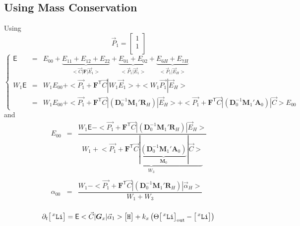 \documentclass[aps,onecolumn,11pt]{revtex4}
\newcommand{\mychem}[1]{\mathtt{#1}}
\newcommand{\myconc}[1]{\big[#1\big]}
\newcommand{\spLi}[1]{{\!~^{#1}\mychem{Li}}}
\newcommand{\Li}[1]{\myconc{\spLi{#1}}}
\newcommand{\spproton}{\mychem{H}}
\newcommand{\proton}{\myconc{\spproton}}
\newcommand{\myout}[1]{{#1}_{\mathrm{out}}}
\newcommand{\LiOut}[1]{\myout{\Li{#1}}}
\newcommand{\mytrn}[1]{{#1}^{\!\mathsf{T}}}
\newcommand{\mymat}[1]{{\bm{#1}}}
\begin{document}
\subsection{Using Mass Conservation}
Using $$\vec{P}_1=\begin{bmatrix}1\\1\\\end{bmatrix}$$
\begin{equation}
\left\lbrace
\begin{array}{rcl}
\mathsf{E}    & = & E_{00} 
+ \underbrace{E_{11}+E_{12}+E_{22}}_{<\vec{C}|\mymat{F}|\vec{E}_1>} 
+ \underbrace{E_{01}+E_{02}}_{<\vec{P}_1|\vec{E}_1>} 
+ \underbrace{E_{6H} + E_{7H}}_{<\vec{P}_1|\vec{E}_H>}\\
W_1\mathsf{E} & = & W_1E_{00} + <\vec{P_1} + \mytrn{\mymat{F}} \vec{C} | W_1 \vec{E}_1 > +  < W_1\vec{P_1} | \vec{E}_H>\\
     & = &  W_1E_{00} + <\vec{P_1} + \mytrn{\mymat{F}} \vec{C}| \left( \mymat{D}_0^{-1} \mymat{M}_1' \mymat{R}_H \right) | \vec{E}_H> + 
     <\vec{P_1} + \mytrn{\mymat{F}} \vec{C}| \left( \mymat{D}_0^{-1} \mymat{M}_1' \mymat{A}_0 \right) | \vec{C}> E_{00}
\end{array}
\right.
\end{equation}
and
\begin{equation}
\boxed{
\begin{array}{rcl}
	E_{00} & = & \dfrac{W_1 \mathsf{E} - <\vec{P_1} + \mytrn{\mymat{F}} \vec{C}| \left( \mymat{D}_0^{-1} \mymat{M}_1' \mymat{R}_H \right) | \vec{E}_H> }
	{ W_1+\underbrace{<\vec{P_1} + \mytrn{\mymat{F}} \vec{C}| \underbrace{\left( \mymat{D}_0^{-1} \mymat{M}_1' \mymat{A}_0 \right)}_{\mymat{M}_0} | \vec{C}>}_{W_3}} \\
	\\
	\alpha_{00} & = & \dfrac{W_1   - <\vec{P_1} + \mytrn{\mymat{F}} \vec{C}| \left( \mymat{D}_0^{-1} \mymat{M}_1' \mymat{R}_H \right) | \vec{\alpha}_H> }
	{ W_1+ W_3 }\\
\end{array}
}
\end{equation}

\begin{equation}
\partial_t \Li{x} = \mathsf{E} <\vec{C}|\mymat{G}_x|\vec{\alpha}_1> \proton+ k_x\left(\Theta \LiOut{x} - \Li{x}\right)\\
\end{equation}
\end{document}
